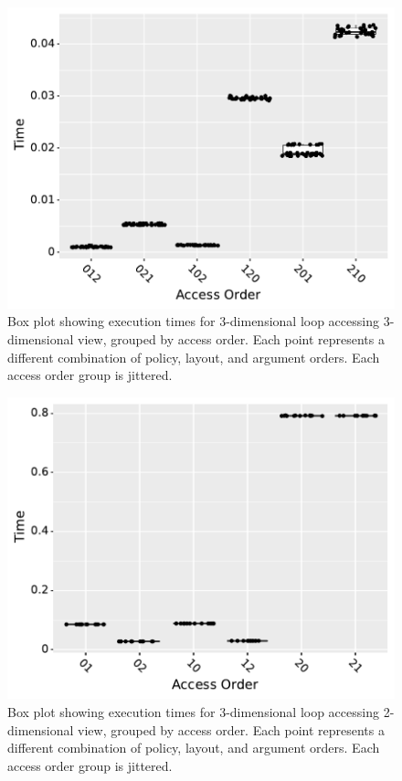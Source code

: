\documentclass[sigconf]{acmart}
\begin{document}
\begin{figure}
	\includegraphics[width=\columnwidth]{benchmark1_boxplot.pdf}
	\caption{Box plot showing execution times for 3-dimensional loop accessing 3-dimensional view, grouped by access order. Each point represents a different combination of policy, layout, and argument orders. Each access order group is jittered.}
	\label{AccessBenchmark1}
\end{figure}

\begin{figure}
	\includegraphics[width=\columnwidth]{benchmark2_boxplot.pdf}
	\caption{Box plot showing execution times for 3-dimensional loop accessing 2-dimensional view, grouped by access order. Each point represents a different combination of policy, layout, and argument orders. Each access order group is jittered.}
	\label{AccessBenchmark2}
\end{figure}
\end{document}
